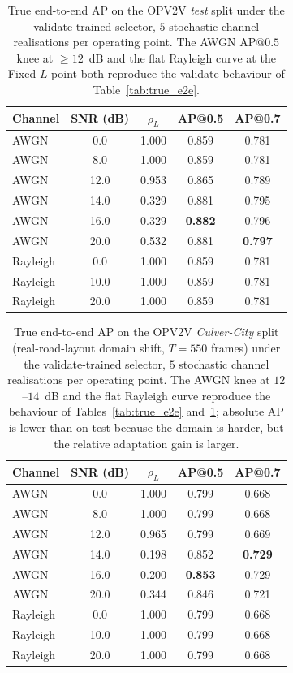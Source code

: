 \documentclass[journal]{IEEEtran}
\begin{document}
\begin{table}[t]
\centering
\caption{True end-to-end AP on the OPV2V \emph{test} split under the validate-trained selector, $5$ stochastic channel realisations per operating point. The AWGN AP@$0.5$ knee at $\ge 12$~dB and the flat Rayleigh curve at the Fixed-$L$ point both reproduce the validate behaviour of Table~\ref{tab:true_e2e}.}\label{tab:gen_true_e2e}
\begin{tabular}{lcccc}
\toprule
Channel & SNR (dB) & $\rho_L$ & AP@0.5 & AP@0.7 \\
\midrule
AWGN     & 0.0  & 1.000 & 0.859 & 0.781 \\
AWGN     & 8.0  & 1.000 & 0.859 & 0.781 \\
AWGN     & 12.0 & 0.953 & 0.865 & 0.789 \\
AWGN     & 14.0 & 0.329 & 0.881 & 0.795 \\
AWGN     & 16.0 & 0.329 & \textbf{0.882} & 0.796 \\
AWGN     & 20.0 & 0.532 & 0.881 & \textbf{0.797} \\
Rayleigh & 0.0  & 1.000 & 0.859 & 0.781 \\
Rayleigh & 10.0 & 1.000 & 0.859 & 0.781 \\
Rayleigh & 20.0 & 1.000 & 0.859 & 0.781 \\
\bottomrule
\end{tabular}
\end{table}

\begin{table}[t]
\centering
\caption{True end-to-end AP on the OPV2V \emph{Culver-City} split (real-road-layout domain shift, $T=550$ frames) under the validate-trained selector, $5$ stochastic channel realisations per operating point. The AWGN knee at $12$--$14$~dB and the flat Rayleigh curve reproduce the behaviour of Tables~\ref{tab:true_e2e} and~\ref{tab:gen_true_e2e}; absolute AP is lower than on test because the domain is harder, but the relative adaptation gain is larger.}\label{tab:gen_true_e2e_culver}
\begin{tabular}{lcccc}
\toprule
Channel & SNR (dB) & $\rho_L$ & AP@0.5 & AP@0.7 \\
\midrule
AWGN     & 0.0  & 1.000 & 0.799 & 0.668 \\
AWGN     & 8.0  & 1.000 & 0.799 & 0.668 \\
AWGN     & 12.0 & 0.965 & 0.799 & 0.669 \\
AWGN     & 14.0 & 0.198 & 0.852 & \textbf{0.729} \\
AWGN     & 16.0 & 0.200 & \textbf{0.853} & 0.729 \\
AWGN     & 20.0 & 0.344 & 0.846 & 0.721 \\
Rayleigh & 0.0  & 1.000 & 0.799 & 0.668 \\
Rayleigh & 10.0 & 1.000 & 0.799 & 0.668 \\
Rayleigh & 20.0 & 1.000 & 0.799 & 0.668 \\
\bottomrule
\end{tabular}
\end{table}
\end{document}

